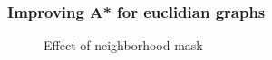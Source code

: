 \begin{frame}
\frametitle{Improving A* for euclidian graphs}
\begin{figure}[ht]
\caption{Effect of neighborhood mask}
\label{fig:}
\end{figure}
\end{frame}


